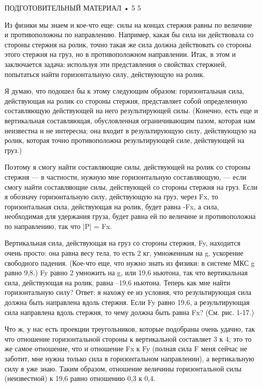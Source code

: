 \documentclass[10pt,oneside]{article}
\begin{document}
ПОДГОТОВИТЕЛЬНЫЙ МАТЕРИАЛ • 5 5\par

Из физики мы знаем и кое-что еще: силы на концах стержня равны по величине и противоположны по направлению. Например, какая бы сила ни действовала со стороны стержня на ролик, точно такая же сила должна действовать со стороны этого стержня на груз, но в противоположном направлении. Итак, в этом и заключается задача: используя эти представления о свойствах стержней, попытаться найти горизонтальную силу, действующую на ролик.\par

Я думаю, что подошел бы к этому следующим образом: горизонтальная сила, действующая на ролик со стороны стержня, представляет собой определенную составляющую действующей на него результирующей силы. (Конечно, есть еще и вертикальная составляющая, обусловленная ограничивающим пазом, которая нам неизвестна и не интересна; она входит в результирующую силу, действующую на ролик, которая точно противоположна результирующей силе, действующей на груз.)\par

Поэтому я смогу найти составляющие силы, действующей на ролик со стороны стержня --- в частности, нужную мне горизонтальную составляющую, --- если смогу найти составляющие силы, действующей со стороны стержня на груз. Если я обозначу горизонтальную силу, действующую на груз, через Fx, то горизонтальная сила, действующая на ролик, будет равна -Fx, а сила, необходимая для удержания груза, будет равна ей по величине и противоположна по направлению, так что |P| = Fx.\par

Вертикальная сила, действующая на груз со стороны стержня, Fy, находится очень просто: она равна весу тела, то есть 2 кг, умноженным на g, ускорение свободного падения. (Кое-что еще, что нужно знать из физики: в системе МКС g равно 9,8.) Fy равно 2 умножить на g, или 19,6 ньютона, так что вертикальная сила, действующая на ролик, равна –19,6 ньютона. Теперь как мне найти горизонтальную силу? Ответ: я нахожу ее из условия, что результирующая сила должна быть направлена вдоль стержня. Если Fy равно 19,6, а результирующая сила направлена вдоль стержня, то чему должна быть равна Fx? (См. рис. 1-17.)\par

Что ж, у нас есть проекции треугольников, которые подобраны очень удачно, так что отношение горизонтальной стороны к вертикальной составляет 3 к 4; это то же самое отношение, что и отношение Fx к Fy (полная сила F меня сейчас не заботит, мне нужна только сила в горизонтальном направлении), а вертикальную силу я уже знаю. Таким образом, отношение величины горизонтальной силы (неизвестной) к 19,6 равно отношению 0,3 к 0,4.\par
\end{document}
